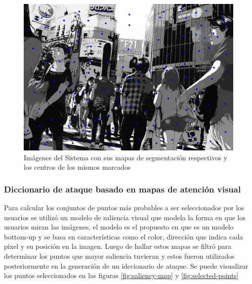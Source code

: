 \begin{figure}[H]
\begin{minipage}[hb]{0.3\textwidth}
	\end{minipage}
	\hfill
	\begin{minipage}[hb]{0.3\textwidth}
		\centering
		\includegraphics[width=\textwidth]{Graphics/japan-segmented.jpg}
	\end{minipage}
	\caption{Imágenes del Sistema con sus mapas de segmentaci\'on respectivos y los centros de los mismos marcados}
	\label{fig:images-segments}
\end{figure}

\subsubsection{Diccionario de ataque basado en mapas de atenci\'on visual}
Para calcular los conjuntos de puntos m\'as probables a ser seleccionados por los usuarios se utiliz\'o un modelo de saliencia visual que modela la forma en que los usuarios miran las im\'agenes, el modelo es el propuesto en \cite{itti2000saliency} que es un modelo bottom-up y se basa en caracter\'isticas como el color, direcci\'on que indica cada pixel y su posici\'on en la imagen. Luego de hallar estos mapas se filtr\'o para determinar los puntos que mayor saliencia tuvieran y estos fueron utilizados posteriormente en la generaci\'on de un idccionario de ataque. Se puede visualizar los puntos seleccionados en las figuras \ref{fig:saliency-map} y \ref{fig:selected-points}

